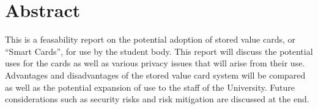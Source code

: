 \section{Abstract}

This is a feasability report on the potential adoption of stored value cards, or ``Smart Cards'', for use by the student body. This report will discuss the potential uses for the cards as well as various privacy issues that will arise from their use. Advantages and disadvantages of the stored value card system will be compared as well as the potential expansion of use to the staff of the University. Future considerations such as security risks and risk mitigation are discussed at the end.

